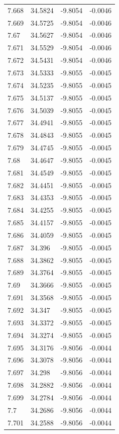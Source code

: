\begin{tabular}{llll}
7.668 & 34.5824 & -9.8054 & -0.0046 \\
7.669 & 34.5725 & -9.8054 & -0.0046 \\
7.67 & 34.5627 & -9.8054 & -0.0046 \\
7.671 & 34.5529 & -9.8054 & -0.0046 \\
7.672 & 34.5431 & -9.8054 & -0.0046 \\
7.673 & 34.5333 & -9.8055 & -0.0045 \\
7.674 & 34.5235 & -9.8055 & -0.0045 \\
7.675 & 34.5137 & -9.8055 & -0.0045 \\
7.676 & 34.5039 & -9.8055 & -0.0045 \\
7.677 & 34.4941 & -9.8055 & -0.0045 \\
7.678 & 34.4843 & -9.8055 & -0.0045 \\
7.679 & 34.4745 & -9.8055 & -0.0045 \\
7.68 & 34.4647 & -9.8055 & -0.0045 \\
7.681 & 34.4549 & -9.8055 & -0.0045 \\
7.682 & 34.4451 & -9.8055 & -0.0045 \\
7.683 & 34.4353 & -9.8055 & -0.0045 \\
7.684 & 34.4255 & -9.8055 & -0.0045 \\
7.685 & 34.4157 & -9.8055 & -0.0045 \\
7.686 & 34.4059 & -9.8055 & -0.0045 \\
7.687 & 34.396 & -9.8055 & -0.0045 \\
7.688 & 34.3862 & -9.8055 & -0.0045 \\
7.689 & 34.3764 & -9.8055 & -0.0045 \\
7.69 & 34.3666 & -9.8055 & -0.0045 \\
7.691 & 34.3568 & -9.8055 & -0.0045 \\
7.692 & 34.347 & -9.8055 & -0.0045 \\
7.693 & 34.3372 & -9.8055 & -0.0045 \\
7.694 & 34.3274 & -9.8055 & -0.0045 \\
7.695 & 34.3176 & -9.8056 & -0.0044 \\
7.696 & 34.3078 & -9.8056 & -0.0044 \\
7.697 & 34.298 & -9.8056 & -0.0044 \\
7.698 & 34.2882 & -9.8056 & -0.0044 \\
7.699 & 34.2784 & -9.8056 & -0.0044 \\
7.7 & 34.2686 & -9.8056 & -0.0044 \\
7.701 & 34.2588 & -9.8056 & -0.0044 \\

\end{tabular}
